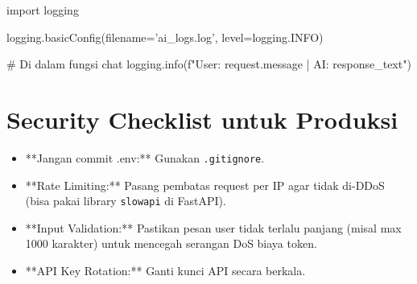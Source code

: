 \begin{codeblock}[language=Python]
import logging

logging.basicConfig(filename='ai_logs.log', level=logging.INFO)

# Di dalam fungsi chat
logging.info(f"User: {request.message} | AI: {response_text}")
\end{codeblock}

\section{Security Checklist untuk Produksi}

\begin{itemize}
    \item [ ] **Jangan commit .env:** Gunakan \texttt{.gitignore}.
    \item [ ] **Rate Limiting:** Pasang pembatas request per IP agar tidak di-DDoS (bisa pakai library \texttt{slowapi} di FastAPI).
    \item [ ] **Input Validation:** Pastikan pesan user tidak terlalu panjang (misal max 1000 karakter) untuk mencegah serangan DoS biaya token.
    \item [ ] **API Key Rotation:** Ganti kunci API secara berkala.
\end{itemize}
